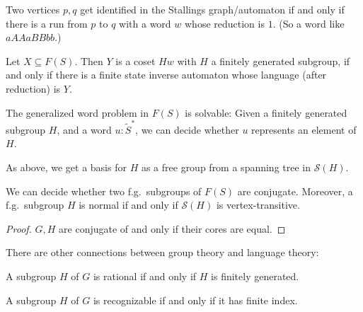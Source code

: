 Two vertices $p,q$ get identified in the Stallings graph/automaton
if and only if there is a run from $p$ to $q$ with a word $w$
whose reduction is $1$. (So a word like $aAAaBBbb$.)

\begin{theorem}
  Let $X \subseteq F(S)$. Then $Y$ is a coset $Hw$ with $H$
  a finitely generated subgroup,
  if and only if
  there is a finite state inverse automaton whose language (after reduction)
  is $Y$.
\end{theorem}

\begin{corollary}
  The generalized word problem in $F(S)$ is solvable:
  Given a finitely generated subgroup $H$, and a word $u : \tilde S^*$,
  we can decide whether $u$ represents an element of $H$.
\end{corollary}

As above, we get a basis for $H$ as a free group from a spanning tree in
$\mathcal{S}(H)$.

\begin{theorem}
  We can decide whether two f.g.\ subgroups of $F(S)$ are conjugate.
  Moreover, a f.g.\ subgroup $H$ is normal if and only if $\mathcal{S}(H)$
  is vertex-transitive.
\end{theorem}
\begin{proof}
  $G,H$ are conjugate of and only if their cores are equal.
\end{proof}

There are other connections between group theory and language theory:
\begin{theorem}
  A subgroup $H$ of $G$ is rational if and only if $H$ is finitely generated.
\end{theorem}
\begin{theorem}
  A subgroup $H$ of $G$ is recognizable if and only if it has finite index.
\end{theorem}
